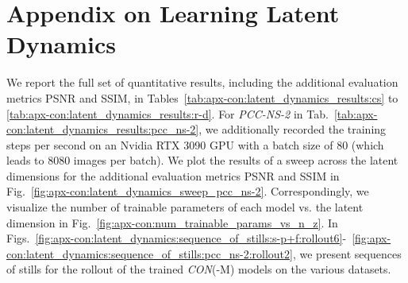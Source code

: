 \section{Appendix on Learning Latent Dynamics}\label{sec:apx-con:latent_dynamics_results}
We report the full set of quantitative results, including the additional evaluation metrics \gls{PSNR} and \gls{SSIM}, in Tables~\ref{tab:apx-con:latent_dynamics_results:cs} to \ref{tab:apx-con:latent_dynamics_results:r-d}. For \emph{PCC-NS-2} in Tab.~\ref{tab:apx-con:latent_dynamics_results:pcc_ns-2}, we additionally recorded the training steps per second on an Nvidia RTX 3090 GPU with a batch size of $80$ (which leads to $8080$ images per batch).
We plot the results of a sweep across the latent dimensions for the additional evaluation metrics \gls{PSNR} and \gls{SSIM} in Fig.~\ref{fig:apx-con:latent_dynamics_sweep_pcc_ns-2}. Correspondingly, we visualize the number of trainable parameters of each model vs. the latent dimension in Fig.~\ref{fig:apx-con:num_trainable_params_vs_n_z}.
In Figs.~\ref{fig:apx-con:latent_dynamics:sequence_of_stills:s-p+f:rollout6}-~\ref{fig:apx-con:latent_dynamics:sequence_of_stills:pcc_ns-2:rollout2}, we present sequences of stills for the rollout of the trained \emph{CON}(-M) models on the various datasets. 

